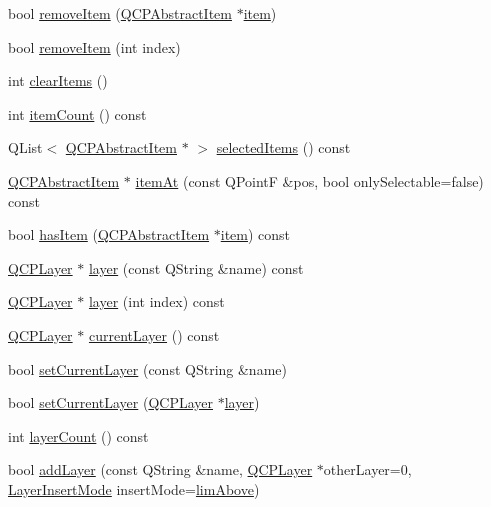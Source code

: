 \begin{DoxyCompactItemize}
\item 
bool \hyperlink{classQCustomPlot_ae04446557292551e8fb6e2c106e1848d}{remove\+Item} (\hyperlink{classQCPAbstractItem}{Q\+C\+P\+Abstract\+Item} $\ast$\hyperlink{classQCustomPlot_a3e842b5a65b1d17fbb96cfb1fa1314d1}{item})
\item 
bool \hyperlink{classQCustomPlot_abcfdda3d601c0441cab136137d715dea}{remove\+Item} (int index)
\item 
int \hyperlink{classQCustomPlot_abdfd07d4f0591d0cf967f85013fd3645}{clear\+Items} ()
\item 
int \hyperlink{classQCustomPlot_a6fc860e30df17fd5c46056bf6fe29390}{item\+Count} () const 
\item 
Q\+List$<$ \hyperlink{classQCPAbstractItem}{Q\+C\+P\+Abstract\+Item} $\ast$ $>$ \hyperlink{classQCustomPlot_a1a48b13547e2d9ac5cd6927516f47a2e}{selected\+Items} () const 
\item 
\hyperlink{classQCPAbstractItem}{Q\+C\+P\+Abstract\+Item} $\ast$ \hyperlink{classQCustomPlot_a793e4b04e0ede11a733021907368fa83}{item\+At} (const Q\+PointF \&pos, bool only\+Selectable=false) const 
\item 
bool \hyperlink{classQCustomPlot_ab4199c38b03e63a2623c82453fe8add5}{has\+Item} (\hyperlink{classQCPAbstractItem}{Q\+C\+P\+Abstract\+Item} $\ast$\hyperlink{classQCustomPlot_a3e842b5a65b1d17fbb96cfb1fa1314d1}{item}) const 
\item 
\hyperlink{classQCPLayer}{Q\+C\+P\+Layer} $\ast$ \hyperlink{classQCustomPlot_aac492da01782820454e9136a8db28182}{layer} (const Q\+String \&name) const 
\item 
\hyperlink{classQCPLayer}{Q\+C\+P\+Layer} $\ast$ \hyperlink{classQCustomPlot_a1e73051e371f1815b48d8b355be0d2ab}{layer} (int index) const 
\item 
\hyperlink{classQCPLayer}{Q\+C\+P\+Layer} $\ast$ \hyperlink{classQCustomPlot_af73057345656cbd1463454982d808b00}{current\+Layer} () const 
\item 
bool \hyperlink{classQCustomPlot_a73a6dc47c653bb6f8f030abca5a11852}{set\+Current\+Layer} (const Q\+String \&name)
\item 
bool \hyperlink{classQCustomPlot_a23a4d3cadad1a0063c5fe19aac5659e6}{set\+Current\+Layer} (\hyperlink{classQCPLayer}{Q\+C\+P\+Layer} $\ast$\hyperlink{classQCustomPlot_aac492da01782820454e9136a8db28182}{layer})
\item 
int \hyperlink{classQCustomPlot_a1b3926884f5bd4bdda1495d8b3c891d0}{layer\+Count} () const 
\item 
bool \hyperlink{classQCustomPlot_ad5255393df078448bb6ac83fa5db5f52}{add\+Layer} (const Q\+String \&name, \hyperlink{classQCPLayer}{Q\+C\+P\+Layer} $\ast$other\+Layer=0, \hyperlink{classQCustomPlot_a75a8afbe6ef333b1f3d47abb25b9add7}{Layer\+Insert\+Mode} insert\+Mode=\hyperlink{classQCustomPlot_a75a8afbe6ef333b1f3d47abb25b9add7a062b0b7825650b432a713c0df6742d41}{lim\+Above})

\end{DoxyCompactItemize}

